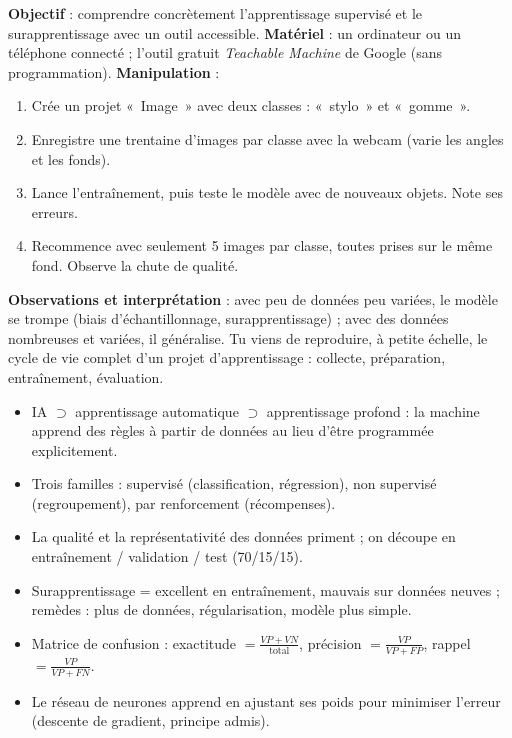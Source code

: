 \documentclass[11pt]{article}
\begin{document}
\begin{experience}
\textbf{Objectif} : comprendre concrètement l'apprentissage supervisé et le surapprentissage avec un outil accessible.
\textbf{Matériel} : un ordinateur ou un téléphone connecté ; l'outil gratuit \emph{Teachable Machine} de Google (sans programmation).
\textbf{Manipulation} :
\begin{enumerate}
  \item Crée un projet «~Image~» avec deux classes : «~stylo~» et «~gomme~».
  \item Enregistre une trentaine d'images par classe avec la webcam (varie les angles et les fonds).
  \item Lance l'entraînement, puis teste le modèle avec de nouveaux objets. Note ses erreurs.
  \item Recommence avec seulement 5 images par classe, toutes prises sur le même fond. Observe la chute de qualité.
\end{enumerate}
\textbf{Observations et interprétation} : avec peu de données peu variées, le modèle se trompe (biais d'échantillonnage, surapprentissage) ; avec des données nombreuses et variées, il généralise. Tu viens de reproduire, à petite échelle, le cycle de vie complet d'un projet d'apprentissage : collecte, préparation, entraînement, évaluation.
\end{experience}

\begin{aretenir}
\begin{itemize}
  \item IA $\supset$ apprentissage automatique $\supset$ apprentissage profond : la machine apprend des règles à partir de données au lieu d'être programmée explicitement.
  \item Trois familles : supervisé (classification, régression), non supervisé (regroupement), par renforcement (récompenses).
  \item La qualité et la représentativité des données priment ; on découpe en entraînement / validation / test (70/15/15).
  \item Surapprentissage = excellent en entraînement, mauvais sur données neuves ; remèdes : plus de données, régularisation, modèle plus simple.
  \item Matrice de confusion : exactitude $= \frac{VP+VN}{\text{total}}$, précision $= \frac{VP}{VP+FP}$, rappel $= \frac{VP}{VP+FN}$.
  \item Le réseau de neurones apprend en ajustant ses poids pour minimiser l'erreur (descente de gradient, principe admis).
\end{itemize}
\end{aretenir}
\end{document}
